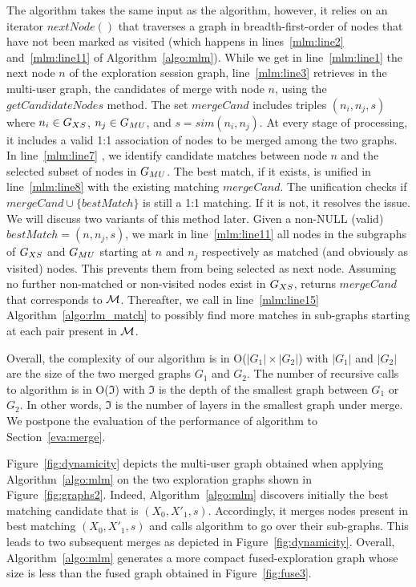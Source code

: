 The \mlm{} algorithm takes the same input as the \rlm{} algorithm, however, it relies on an iterator $nextNode()$ that traverses a graph in breadth-first-order of nodes that have not been marked as visited (which happens in lines~\ref{mlm:line2} and~\ref{mlm:line11} of Algorithm~\ref{algo:mlm}). 
While we get in line~\ref{mlm:line1} the next node $n$ of the exploration session graph, line~\ref{mlm:line3} retrieves in the multi-user graph, the candidates of merge with node $n$, using the $getCandidateNodes$ method.
The set $mergeCand$ includes triples $(n_i, n_j, s)$ where $n_i \in G_{XS}$, $n_j \in G_{MU}$, and $s = sim(n_i, n_j)$. At every stage of processing, it includes a valid 1:1 association of nodes to be merged among the two graphs. In line~\ref{mlm:line7} , we identify candidate matches between node $n$ and the selected subset of nodes in $G_{MU}$. The best match, if it exists, is unified in line~\ref{mlm:line8}  with the existing matching $mergeCand$. The unification checks if  $mergeCand \cup \{bestMatch\}$ is still a 1:1 matching. If it is not, it resolves the issue. We will discuss two variants of this method later. 
Given a non-NULL (valid) $bestMatch = (n, n_j, s)$, we mark in line~\ref{mlm:line11}  all nodes in the subgraphs of $G_{XS}$ and $G_{MU}$ starting at $n$ and $n_j$ respectively as matched (and obviously as visited) nodes. 
This prevents them from being selected as next node. 
Assuming no further non-matched or non-visited nodes exist in $G_{XS}$, \mlm{} returns $mergeCand$ that corresponds to ${\mathcal M}$.
Thereafter, we call in line~\ref{mlm:line15}  Algorithm~\ref{algo:rlm_match} to possibly find more matches in sub-graphs starting at each pair present in ${\mathcal M}$.



Overall, the complexity of our \mlm{} algorithm is in O($|G_1| \times |G_2|$)  with 
 $|G_1|$ and $|G_2|$ are the size of the two merged graphs $G_1$ and $G_2$.
 The number of recursive calls to \rlm{} algorithm is in O($\Im$) with $\Im$ is the depth of the smallest graph between $G_1$ or $G_2$. In other words, $\Im$ is the number of layers in the smallest graph under merge.
We postpone the evaluation of the performance  of \mlm{} algorithm to Section~\ref{eva:merge}.




Figure~\ref{fig:dynamicity} depicts the multi-user graph obtained when applying Algorithm~\ref{algo:mlm} on the two exploration graphs shown in Figure~\ref{fig:graphs2}.
Indeed, Algorithm~\ref{algo:mlm} discovers initially the best matching candidate that is $(X_0, X'_1, s)$. Accordingly, it merges nodes present in best matching $(X_0, X'_1, s)$ and calls \rlm{} algorithm to go over their sub-graphs. This leads to two subsequent merges as depicted in Figure~\ref{fig:dynamicity}. Overall, Algorithm~\ref{algo:mlm} generates a more compact fused-exploration graph whose size is less than the fused graph obtained in Figure~\ref{fig:fuse3}.

